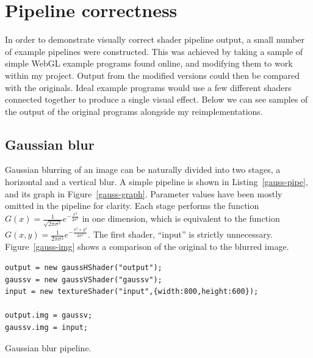 \documentclass[12pt,twoside,notitlepage]{report}
\begin{document}
\section{Pipeline correctness}
In order to demonstrate visually correct shader pipeline output, a small number of example pipelines were constructed. This was achieved by taking a sample of simple WebGL example programs found online, and modifying them to work within my project. Output from the modified versions could then be compared with the originals. Ideal example programs would use a few different shaders connected together to produce a single visual effect. Below we can see samples of the output of the original programs alongside my reimplementations.

\subsection*{Gaussian blur}
Gaussian blurring of an image can be naturally divided into two stages, a horizontal and a vertical blur. A simple pipeline is shown in Listing~\ref{gauss-pipe}, and its graph in Figure~\ref{gauss-graph}. Parameter values have been mostly omitted in the pipeline for clarity. Each stage performs the function $G(x) = \frac{1}{\sqrt{2\pi \sigma^2}} e^{-\frac{x^2}{2 \sigma^2}}$ in one dimension, which is equivalent to the function $G(x,y) = \frac{1}{2\pi \sigma^2} e^{-\frac{x^2 + y^2}{2 \sigma^2}}$. The first shader, ``input'' is strictly unnecessary. Figure~\ref{gauss-img} shows a comparison of the original to the blurred image.

\begin{listing}[H]
\begin{verbatim}
output = new gaussHShader("output");
gaussv = new gaussVShader("gaussv");
input = new textureShader("input",{width:800,height:600});

output.img = gaussv;
gaussv.img = input;
\end{verbatim}
\caption{Gaussian blur pipeline.\label{gauss-pipe}}
\end{listing}
\end{document}
